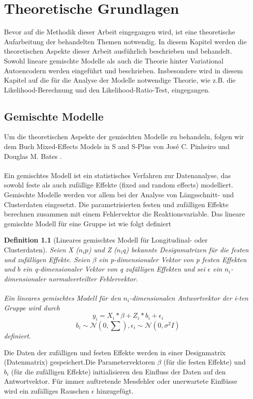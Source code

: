 \documentclass[%
thesis=student,%
coverpage=false,%
titlepage=false,%
headmarks=true, %
german,%
font=libertine, %
math=newpxtx, %
BCOR=5mm,%
coverBCOR=11mm%
]{tumbook}
\theoremstyle{break}
\newtheorem{definition}{Definition}[section]
\begin{document}
\chapter{Theoretische Grundlagen}
Bevor auf die Methodik dieser Arbeit eingegangen wird, ist eine theoretische Aufarbeitung der behandelten Themen notwendig. In diesem Kapitel werden die theoretischen Aspekte dieser Arbeit ausführlich beschrieben und behandelt. Sowohl lineare gemischte Modelle als auch die Theorie hinter Variational Autoencodern werden eingeführt und beschrieben. Insbesondere wird in diesem Kapitel auf die für die Analyse der Modelle notwendige Theorie, wie z.B. die Likelihood-Berechnung und den Likelihood-Ratio-Test, eingegangen.
\section{Gemischte Modelle}
Um die theoretischen Aspekte der gemischten Modelle zu behandeln, folgen wir dem Buch Mixed-Effects Models in S and S-Plus von José C. Pinheiro und Douglas M. Bates \cite{pinheiro2000}.\\
\\
Ein gemischtes Modell ist ein statistisches Verfahren zur Datenanalyse, das sowohl feste als auch zufällige Effekte (fixed and random effects) modelliert. Gemischte Modelle werden vor allem bei der Analyse von Längsschnitt- und Clusterdaten eingesetzt.
Die parametrisierten festen und zufälligen Effekte berechnen zusammen mit einem Fehlervektor die Reaktionsvariable. Das lineare gemischte Modell für eine Gruppe ist wie folgt definiert
\begin{definition}[Lineares gemischtes Modell für Longitudinal- oder Clusterdaten] 
	Seien X ($n_i$$p$) und Z ($n_i$$q$) bekannte Designmatrizen für die festen und zufälligen Effekte. Seien $\beta$ ein p-dimensionaler Vektor von p festen Effekten und $b$ ein q-dimensionaler Vektor von q zufälligen Effekten und sei $\epsilon$ ein $n_i$-dimensionaler normalverteilter Fehlervektor.\\
	\\
	Ein lineares gemischtes Modell für den $n_i$-dimensionalen Antwortvektor der i-ten Gruppe wird durch 
	$$y_i = X_i * \beta + Z_i * b_i + \epsilon_i$$ 
	$$b_i \sim \mathcal{N}(0,\sum), \epsilon_i \sim \mathcal{N}(0,\sigma^2I)$$
	definiert.
\end{definition}\noindent
Die Daten der zufälligen und festen Effekte werden in einer Designmatrix (Datenmatrix) gespeichert.Die Parametervektoren $\beta$ (für die festen Effekte) und $b_i$ (für die zufälligen Effekte) initialisieren den Einfluss der Daten auf den Antwortvektor. Für immer auftretende Messfehler oder unerwartete Einflüsse wird ein zufälliges Rauschen $\epsilon$ hinzugefügt.\\
\end{document}
